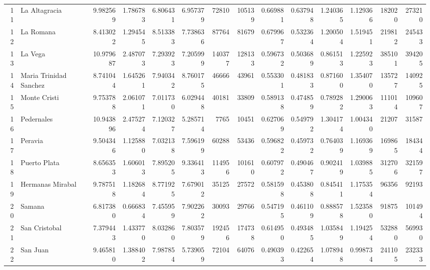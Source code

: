 \begin{tabular}{rlrrrrrrrrrrrr}
   11 &           La Altagracia &   9.982569 &  1.786783 &   6.806431 &   6.957379 &      72810 &     105139 &     0.669881 &     0.637948 &    1.240365 &    1.129366 &   182020 &   273210 \\
   12 &               La Romana &   8.413022 &  1.294545 &   8.513383 &   7.738636 &      87764 &      81679 &     0.679967 &     0.532364 &    1.200504 &    1.519451 &   219812 &   245433 \\
   13 &                 La Vega &  10.979687 &  2.487073 &   7.293923 &   7.205999 &     140377 &     128133 &     0.596732 &     0.503689 &    0.861513 &    1.225923 &   385101 &   394205 \\
   14 &  Maria Trinidad Sanchez &   8.741044 &  1.645261 &   7.940342 &   8.760175 &      46666 &      43961 &     0.553301 &     0.481833 &    0.871600 &    1.354070 &   135727 &   140925 \\
   15 &            Monte Cristi &   9.753788 &  2.061071 &   7.011730 &   6.029448 &      40181 &      33809 &     0.589138 &     0.474859 &    0.789282 &    1.290063 &   111014 &   109607 \\
   16 &              Pedernales &  10.943896 &  2.475274 &   7.120327 &   5.285714 &       7765 &      10451 &     0.627069 &     0.549792 &    1.304174 &    1.004340 &    21207 &    31587 \\
   17 &                 Peravia &   9.504346 &  1.125880 &   7.032138 &   7.596199 &      60288 &      53436 &     0.596822 &     0.459732 &    0.764039 &    1.169369 &   169865 &   184344 \\
   18 &            Puerto Plata &   8.656353 &  1.606013 &   7.895205 &   9.336413 &     114956 &     101610 &     0.607972 &     0.490467 &    0.902419 &    1.039885 &   312706 &   321597 \\
   19 &        Hermanas Mirabal &   9.787518 &  1.182684 &   8.771925 &   7.679012 &      35125 &      27572 &     0.581598 &     0.453808 &    0.845411 &    1.175354 &    96356 &    92193 \\
   20 &                  Samana &   6.817380 &  0.666834 &   7.455959 &   7.902262 &      30093 &      29766 &     0.547195 &     0.461109 &    0.888578 &    1.523580 &    91875 &   101494 \\
   21 &           San Cristobal &   7.379443 &  1.433770 &   8.032860 &   7.803579 &     192456 &     174738 &     0.614950 &     0.493485 &    1.035849 &    1.194254 &   532880 &   569930 \\
   22 &                San Juan &   9.465810 &  1.388402 &   7.987854 &   5.739059 &      72104 &      64076 &     0.490393 &     0.422654 &    1.078948 &    0.998734 &   241105 &   232333 \\

\end{tabular}
